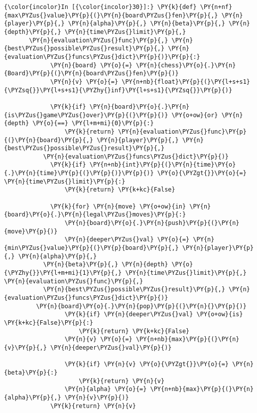     \begin{Verbatim}[commandchars=\\\{\}]
{\color{incolor}In [{\color{incolor}30}]:} \PY{k}{def} \PY{n+nf}{max\PYZus{}value}\PY{p}{(}\PY{n}{board\PYZus{}fen}\PY{p}{,} \PY{n}{player}\PY{p}{,} \PY{n}{alpha}\PY{p}{,} \PY{n}{beta}\PY{p}{,} \PY{n}{depth}\PY{p}{,} \PY{n}{time\PYZus{}limit}\PY{p}{,} 
	   \PY{n}{evaluation\PYZus{}func}\PY{p}{,} \PY{n}{best\PYZus{}possible\PYZus{}result}\PY{p}{,} \PY{n}{evaluation\PYZus{}funcs\PYZus{}dict}\PY{p}{)}\PY{p}{:}
             \PY{n}{board} \PY{o}{=} \PY{n}{chess}\PY{o}{.}\PY{n}{Board}\PY{p}{(}\PY{n}{board\PYZus{}fen}\PY{p}{)}
             \PY{n}{v} \PY{o}{=} \PY{n+nb}{float}\PY{p}{(}\PY{l+s+s1}{\PYZsq{}}\PY{l+s+s1}{\PYZhy{}inf}\PY{l+s+s1}{\PYZsq{}}\PY{p}{)}
         
             \PY{k}{if} \PY{n}{board}\PY{o}{.}\PY{n}{is\PYZus{}game\PYZus{}over}\PY{p}{(}\PY{p}{)} \PY{o+ow}{or} \PY{n}{depth} \PY{o}{==} \PY{l+m+mi}{0}\PY{p}{:}
                 \PY{k}{return} \PY{n}{evaluation\PYZus{}func}\PY{p}{(}\PY{n}{board}\PY{p}{,} \PY{n}{player}\PY{p}{,} \PY{n}{best\PYZus{}possible\PYZus{}result}\PY{p}{,} 
		   \PY{n}{evaluation\PYZus{}funcs\PYZus{}dict}\PY{p}{)}
             \PY{k}{if} \PY{n+nb}{int}\PY{p}{(}\PY{n}{time}\PY{o}{.}\PY{n}{time}\PY{p}{(}\PY{p}{)}\PY{p}{)} \PY{o}{\PYZgt{}}\PY{o}{=} \PY{n}{time\PYZus{}limit}\PY{p}{:}
                 \PY{k}{return} \PY{k+kc}{False}
         
             \PY{k}{for} \PY{n}{move} \PY{o+ow}{in} \PY{n}{board}\PY{o}{.}\PY{n}{legal\PYZus{}moves}\PY{p}{:}
                 \PY{n}{board}\PY{o}{.}\PY{n}{push}\PY{p}{(}\PY{n}{move}\PY{p}{)}
                 \PY{n}{deeper\PYZus{}val} \PY{o}{=} \PY{n}{min\PYZus{}value}\PY{p}{(}\PY{p}{board}\PY{p}{,} \PY{n}{player}\PY{p}{,} \PY{n}{alpha}\PY{p}{,} 
		   \PY{n}{beta}\PY{p}{,} \PY{n}{depth} \PY{o}{\PYZhy{}}\PY{l+m+mi}{1}\PY{p}{,} \PY{n}{time\PYZus{}limit}\PY{p}{,} \PY{n}{evaluation\PYZus{}func}\PY{p}{,} 
		   \PY{n}{best\PYZus{}possible\PYZus{}result}\PY{p}{,} \PY{n}{evaluation\PYZus{}funcs\PYZus{}dict}\PY{p}{)}
		 \PY{n}{board}\PY{o}{.}\PY{n}{pop}\PY{p}{(}\PY{n}{}\PY{p}{)}
                 \PY{k}{if} \PY{n}{deeper\PYZus{}val} \PY{o+ow}{is} \PY{k+kc}{False}\PY{p}{:}
                     \PY{k}{return} \PY{k+kc}{False}
                 \PY{n}{v} \PY{o}{=} \PY{n+nb}{max}\PY{p}{(}\PY{n}{v}\PY{p}{,} \PY{n}{deeper\PYZus{}val}\PY{p}{)}
         
                 \PY{k}{if} \PY{n}{v} \PY{o}{\PYZgt{}}\PY{o}{=} \PY{n}{beta}\PY{p}{:}
                     \PY{k}{return} \PY{n}{v}
                 \PY{n}{alpha} \PY{o}{=} \PY{n+nb}{max}\PY{p}{(}\PY{n}{alpha}\PY{p}{,} \PY{n}{v}\PY{p}{)}
             \PY{k}{return} \PY{n}{v}
\end{Verbatim}

